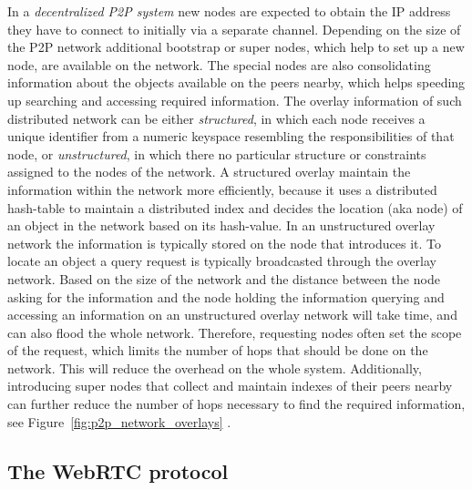In a \emph{decentralized \gls{P2P} system} new nodes are expected to obtain the \gls{IP} address they have to connect to initially via a separate channel. Depending on the size of the \gls{P2P} network additional bootstrap or super nodes, which help to set up a new node, are available on the network. The special nodes are also consolidating information about the objects available on the peers nearby, which helps speeding up searching and accessing required information. The overlay information of such distributed network can be either \emph{structured}, in which each node receives a unique identifier from a numeric keyspace resembling the responsibilities of that node, or \emph{unstructured}, in which there no particular structure or constraints assigned to the nodes of the network. A structured overlay maintain the information within the network more efficiently, because it uses a distributed hash-table to maintain a distributed index and decides the location (aka node) of an object in the network based on its hash-value. In an unstructured overlay network the information is typically stored on the node that introduces it. To locate an object a query request is typically broadcasted through the overlay network. Based on the size of the network and the distance between the node asking for the information and the node holding the information querying and accessing an information on an unstructured overlay network will take time, and can also flood the whole network. Therefore, requesting nodes often set the scope of the request, which limits the number of hops that should be done on the network. This will reduce the overhead on the whole system. Additionally, introducing super nodes that collect and maintain indexes of their peers nearby can further reduce the number of hops necessary to find the required information, see Figure~\ref{fig:p2p_network_overlays} \citep{rodrigues2010peer}.


\subsection{The \gls{WebRTC} protocol}
\label{sec:p2p_webrtc}



